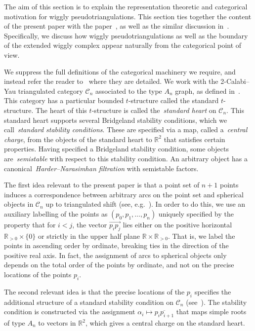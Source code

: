 \documentclass{amsart}
\theoremstyle{definition}
\newcommand{\darkblue}{\color{darkblue}} %
\newcommand{\defn}[1]{\textsl{\darkblue #1}} %
\begin{document}
The aim of this section is to explain the representation theoretic and categorical motivation for wiggly pseudotriangulations.
This section ties together the content of the present paper with the paper~\cite{BapatDeopurkarLicata}, as well as the similar discussion in~\cite[\S5]{BapatPilaud-wigglyaligned}.
Specifically, we discuss how wiggly pseudotriangulations as well as the boundary of the extended wiggly complex appear naturally from the categorical point of view.

We suppress the full definitions of the categorical machinery we require, and instead refer the reader to~\cite[\S5]{BapatDeopurkarLicata} where they are detailed.
We work with the 2-Calabi--Yau triangulated category \(\mathcal{C}_n\) associated to the type \(A_n\) graph, as defined in~\cite[\S5.2]{BapatDeopurkarLicata}.
This category has a particular bounded \(t\)-structure called the standard \(t\)-structure.
The heart of this \(t\)-structure is called the~\defn{standard heart} on \(\mathcal{C}_n\).
This standard heart supports several Bridgeland stability conditions, which we call~\defn{standard stability conditions}.
These are specified via a map, called a~\defn{central charge}, from the objects of the standard heart to \(\mathbb{R}^2\) that satisfies certain properties.
Having specified a Bridgeland stability condition, some objects are~\defn{semistable} with respect to this stability condition.
An arbitrary object has a canonical~\defn{Harder--Narasimhan filtration} with semistable factors.

The first idea relevant to the present paper is that a point set of \(n+1\) points induces a correspondence between arbitrary arcs on the point set and spherical objects in \(\mathcal{C}_n\) up to triangulated shift (see, e.g.~\cite[Prop.~5.4]{BapatDeopurkarLicata}).
In order to do this, we use an auxiliary labelling of the points as \((p_0, p_1, \ldots, p_n)\) uniquely specified by the property that for \(i < j\), the vector \(\overrightarrow{p_ip_j}\) lies either on the positive horizontal \(\mathbb{R}_{> 0} \times \{0\}\) or strictly in the upper half plane \(\mathbb{R} \times \mathbb{R}_{> 0}\).
That is, we label the points in ascending order by ordinate, breaking ties in the direction of the positive real axis.
In fact, the assignment of arcs to spherical objects only depends on the total order of the points by ordinate, and not on the precise locations of the points \(p_i\).

The second relevant idea is that the precise locations of the \(p_i\) specifies the additional structure of a standard stability condition on \(\mathcal{C}_n\) (see~\cite[Prop.~6.3]{BapatDeopurkarLicata}).
The stability condition is constructed via the assignment \(\alpha_i \mapsto \overline{p_ip_{i+1}}\) that maps simple roots of type \(A_n\) to vectors in \(\mathbb{R}^2\), which gives a central charge on the standard heart.
\end{document}
